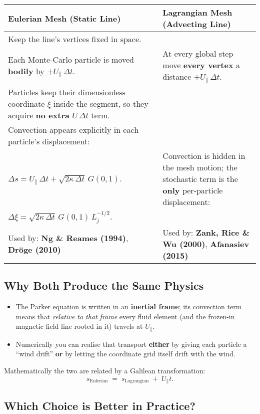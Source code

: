 \begin{table}[h!]
\centering
\begin{tabular}{|p{7cm}|p{7cm}|}
\hline
\textbf{Eulerian Mesh (Static Line)} & \textbf{Lagrangian Mesh (Advecting Line)} \\
\hline
Keep the line’s vertices fixed in space. \\ Each Monte-Carlo particle is moved \textbf{bodily} by $+U_{\parallel}\,\Delta t$. & At every global step move \textbf{every vertex} a distance $+U_{\parallel}\,\Delta t$. \\ Particles keep their dimensionless coordinate $\xi$ inside the segment, so they acquire \textbf{no extra} $U\,\Delta t$ term. \\
\hline
Convection appears explicitly in each particle’s displacement: \\ $\Delta s = U_{\parallel}\,\Delta t + \sqrt{2\kappa\,\Delta t}\,G(0,1)$. & Convection is hidden in the mesh motion; the stochastic term is the \textbf{only} per-particle displacement: \\ $\Delta \xi = \sqrt{2\kappa\,\Delta t}\,G(0,1)\,L_j^{-1/2}$. \\
\hline
Used by: \textbf{Ng \& Reames (1994)}, \textbf{Dröge (2010)} & Used by: \textbf{Zank, Rice \& Wu (2000)}, \textbf{Afanasiev (2015)} \\
\hline
\end{tabular}
\end{table}

\subsection*{Why Both Produce the Same Physics}

\begin{itemize}
\item The Parker equation is written in an \textbf{inertial frame}; its convection term means that \emph{relative to that frame} every fluid element (and the frozen-in magnetic field line rooted in it) travels at $U_{\parallel}$.
\item Numerically you can realise that transport \textbf{either} by giving each particle a “wind drift” \textbf{or} by letting the coordinate grid itself drift with the wind.
\end{itemize}

Mathematically the two are related by a Galilean transformation:
\[
s_{\text{Eulerian}} \;=\; s_{\text{Lagrangian}} \;+\; U_{\parallel}t .
\]

\subsection*{Which Choice is Better in Practice?}

